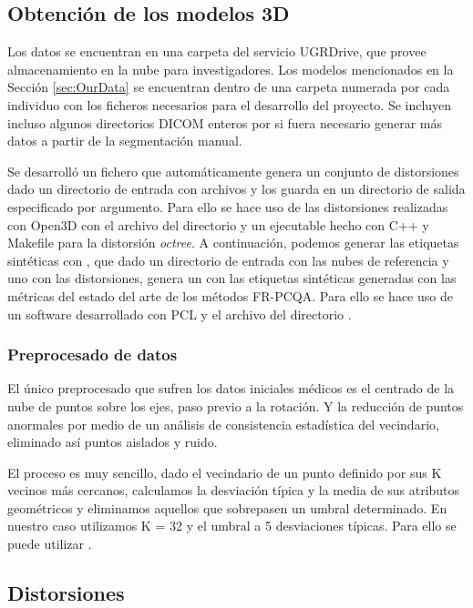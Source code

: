 \subsection{Obtención de los modelos 3D}
Los datos se encuentran en una carpeta del servicio UGRDrive, que provee almacenamiento 
en la nube para investigadores. Los modelos mencionados en la Sección \ref{sec:OurData} 
se encuentran dentro de una carpeta numerada por cada individuo con los ficheros 
necesarios para el desarrollo del proyecto. Se incluyen incluso algunos directorios 
DICOM enteros por si fuera necesario generar más datos a partir de la segmentación 
manual. 

Se desarrolló un fichero  que automáticamente genera 
un conjunto de distorsiones dado un directorio de entrada con archivos  y los 
guarda en un directorio de salida especificado por argumento. Para ello se hace 
uso de las distorsiones realizadas con Open3D\cite{Open3D} 
con el archivo del directorio  y un ejecutable hecho 
con C++ y Makefile para la distorsión \emph{octree}. A continuación, 
podemos generar las etiquetas sintéticas con , que dado un 
directorio de entrada con las nubes de referencia y uno con las distorsiones, 
genera un  con las etiquetas sintéticas generadas con las métricas 
del estado del arte de los métodos FR-PCQA. Para ello se hace uso de un 
software desarrollado con PCL\cite{PCL} y el archivo del directorio . 

\subsubsection{Preprocesado de datos}
El único preprocesado que sufren los datos iniciales médicos es el centrado de la nube 
de puntos sobre los ejes, paso previo a la rotación. Y la reducción de puntos 
anormales por medio de un análisis de consistencia estadística del vecindario,
eliminado así puntos aislados y ruido. 

El proceso es muy sencillo, dado el vecindario de un punto definido por sus 
K vecinos más cercanos, calculamos la desviación típica y la media de sus atributos 
geométricos y eliminamos aquellos que sobrepasen un umbral determinado. 
En nuestro caso utilizamos K = 32 y el umbral a 5 desviaciones típicas. Para 
ello se puede utilizar .

\subsection{Distorsiones}
\label{sec:DatosSinteticos}
